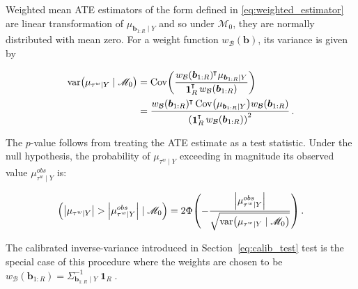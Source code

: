 \documentclass[letter]{article}
\DeclarePairedDelimiter{\parenthesis}{\lparen}{\rparen}
\DeclarePairedDelimiter{\absolutevalue}{\lvert}{\rvert}
\newcommand{\del}[1]{\parenthesis*{#1}}
\newcommand{\abs}[1]{\absolutevalue*{#1}}
\let\Pr\relax
\DeclareMathOperator{\Pr}{\mathbb{P}}
\DeclareMathOperator{\cov}{{Cov}}
\DeclareMathOperator{\var}{{var}}
\DeclareMathOperator{\ones}{\mathbf{1}}
\newcommand*{\trans}{^{\mkern-1.5mu\intercal}}
\newcommand{\border}{\mathcal{B}}
\newcommand{\sentinel}{\bm{b}}
\newcommand{\numsent}{R}
\newcommand{\sentinels}{\sentinel_{1:\numsent}}
\newcommand{\tauw}{\tau^{w}}
\newcommand{\modnull}{\mathscr{M}_0}
\newcommand{\weightb}{w_{\border}}
\begin{document}
    	Weighted mean ATE estimators of the form defined in \eqref{eq:weighted_estimator} are linear transformation of \(\mu_{\sentinels \mid Y}\) and so under \(\modnull\), they are normally distributed with mean zero.
For a weight function \(\weightb(\sentinel)\), its variance is given by

\begin{equation}
\begin{aligned}
    \var\del{\mu_{\tauw \mid Y} \mid \modnull} &= \cov\del{ \frac{\weightb(\sentinels)\trans \mu_{\sentinels \mid Y}}{\ones_{\numsent}\trans \weightb(\sentinels)}} \\
    &= \frac{\weightb(\sentinels) \trans \cov \del{\mu_{\sentinels \mid Y}} \weightb(\sentinels)}{\del{\ones_{\numsent}\trans \weightb(\sentinels)}^2}
    \,.
\end{aligned}
\end{equation}
    


    	The \(p\)-value follows from treating the ATE estimate as a test statistic.
Under the null hypothesis, the probability of \(\mu_{\tauw \mid Y}\) exceeding in magnitude its observed value \(\mu_{\tauw \mid Y}^{obs}\) is:

\begin{equation}
    \Pr\del{ \abs{\mu_{\tauw \mid Y}} > \abs{\mu_{\tauw \mid Y}^{obs}} \mid \modnull} = 2 \Phi\del{ -\frac{\abs{\mu_{\tauw \mid Y}^{obs}}}{\sqrt{\var\del{\mu_{\tauw \mid Y} \mid \modnull}}} }\,.
\end{equation}

The calibrated inverse-variance introduced in Section~\ref{eq:calib_test} test is the special case of this procedure where the weights are chosen to be \(\weightb(\sentinels) = \Sigma^{-1}_{\sentinels \mid Y} \ones_{\numsent}\).
    
\end{document}
